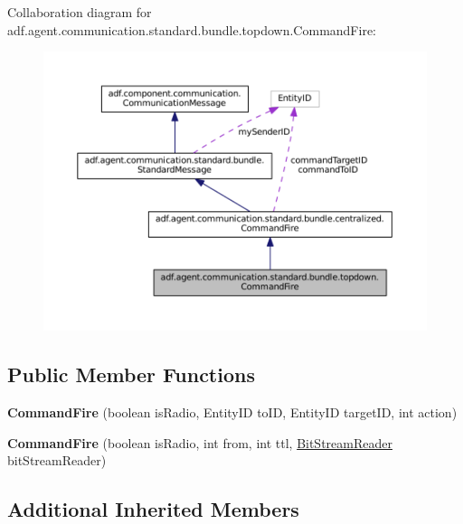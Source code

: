 Collaboration diagram for adf.\+agent.\+communication.\+standard.\+bundle.\+topdown.\+Command\+Fire\+:
\nopagebreak
\begin{figure}[H]
\begin{center}
\leavevmode
\includegraphics[width=350pt]{classadf_1_1agent_1_1communication_1_1standard_1_1bundle_1_1topdown_1_1CommandFire__coll__graph}
\end{center}
\end{figure}
\subsection*{Public Member Functions}
\begin{DoxyCompactItemize}
\item 
\hypertarget{classadf_1_1agent_1_1communication_1_1standard_1_1bundle_1_1topdown_1_1CommandFire_a096f6d1f59e59d3e50d4aaa81627ffe5}{}\label{classadf_1_1agent_1_1communication_1_1standard_1_1bundle_1_1topdown_1_1CommandFire_a096f6d1f59e59d3e50d4aaa81627ffe5} 
{\bfseries Command\+Fire} (boolean is\+Radio, Entity\+ID to\+ID, Entity\+ID target\+ID, int action)
\item 
\hypertarget{classadf_1_1agent_1_1communication_1_1standard_1_1bundle_1_1topdown_1_1CommandFire_a7a3979249cfbe7491fcb6a25ba3b7260}{}\label{classadf_1_1agent_1_1communication_1_1standard_1_1bundle_1_1topdown_1_1CommandFire_a7a3979249cfbe7491fcb6a25ba3b7260} 
{\bfseries Command\+Fire} (boolean is\+Radio, int from, int ttl, \hyperlink{classadf_1_1component_1_1communication_1_1util_1_1BitStreamReader}{Bit\+Stream\+Reader} bit\+Stream\+Reader)
\end{DoxyCompactItemize}
\subsection*{Additional Inherited Members}


